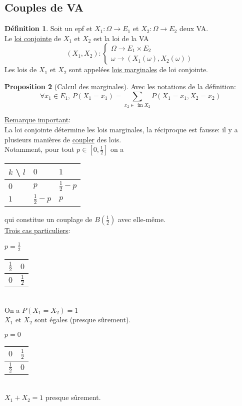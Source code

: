 \documentclass[10pt,a4paper]{article}
\theoremstyle{definition}
\newtheorem{proposition}{Proposition}[section]
\newtheorem{definition}[proposition]{Définition}
\DeclareMathOperator{\im}{im}
\begin{document}
\subsection{Couples de VA}
\begin{definition}
Soit un epf et $X_1: \Omega \to E_1$ et $X_2: \Omega \to E_2$ deux VA. \\
Le \uline{loi conjointe} de $X_1$ et $X_2$ est la loi de la VA
\[ (X_1, X_2) : \begin{cases}
\Omega \to E_1 \times E_2 \\
\omega \to \left(X_1(\omega), X_2(\omega) \right)
\end{cases} \]
Les lois de $X_1$ et $X_2$ sont appelées \uline{lois marginales} de loi conjointe.
\end{definition}
\begin{proposition}[Calcul des marginales]
Avec les notations de la définition:
\[ \forall x_1 \in E_1 ,\, P(X_1 = x_1) = \sum_{x_2 \in \, \im X_2} P(X_1 = x_1, X_2 = x_2) \]
\end{proposition}
\noindent \uline{Remarque important}: \\
La loi conjointe détermine les lois marginales, la réciproque est fausse: il y a plusieurs manières de \uline{coupler} des lois. \\
Notamment, pour tout $p \in \left[ 0, \frac{1}{2} \right]$ on a
\begin{center}
\begin{tabular}{M{3em} | M{3em} | M{3em}}
$k$ \textbackslash $\,\, l$ & $0$ & $1$ \\
\hline
$0$ & $p$ & $\frac{1}{2} - p$ \\
\hline
$1$ & $\frac{1}{2} - p$ & $p$
\end{tabular}
\end{center}
qui constitue un couplage de $B\left(\frac{1}{2} \right)$ avec elle-même. \\
\uline{Trois cas particuliers}: \medskip

$p = \frac{1}{2}$ \quad
\begin{tabular}{M{3em} | M{3em}}
$\frac{1}{2}$ & $0$ \\
\hline
$0$ & $\frac{1}{2}$ \\
\end{tabular} \\
On a $P(X_1 = X_2) = 1$ \\
$X_1$ et $X_2$ sont égales (presque sûrement). \medskip

$p = 0$ \quad
\begin{tabular}{M{3em} | M{3em}}
$0$ & $\frac{1}{2}$ \\
\hline
$\frac{1}{2}$ & $0$ \\
\end{tabular} \\
$X_1 + X_2 = 1$ presque sûrement. \medskip
\end{document}
